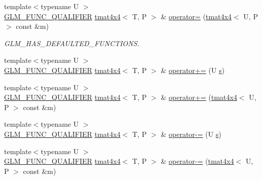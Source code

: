 \begin{DoxyCompactItemize}
\item 
{\footnotesize template$<$typename U $>$ }\\\mbox{\hyperlink{setup_8hpp_a33fdea6f91c5f834105f7415e2a64407}{G\+L\+M\+\_\+\+F\+U\+N\+C\+\_\+\+Q\+U\+A\+L\+I\+F\+I\+ER}} \mbox{\hyperlink{structglm_1_1tmat4x4}{tmat4x4}}$<$ T, P $>$ \& \mbox{\hyperlink{structglm_1_1tmat4x4_a967c1c1711875b670d5a325d86566209}{operator=}} (\mbox{\hyperlink{structglm_1_1tmat4x4}{tmat4x4}}$<$ U, P $>$ const \&m)
\begin{DoxyCompactList}\small\item\em G\+L\+M\+\_\+\+H\+A\+S\+\_\+\+D\+E\+F\+A\+U\+L\+T\+E\+D\+\_\+\+F\+U\+N\+C\+T\+I\+O\+NS. \end{DoxyCompactList}\item 
{\footnotesize template$<$typename U $>$ }\\\mbox{\hyperlink{setup_8hpp_a33fdea6f91c5f834105f7415e2a64407}{G\+L\+M\+\_\+\+F\+U\+N\+C\+\_\+\+Q\+U\+A\+L\+I\+F\+I\+ER}} \mbox{\hyperlink{structglm_1_1tmat4x4}{tmat4x4}}$<$ T, P $>$ \& \mbox{\hyperlink{structglm_1_1tmat4x4_aef40b6c6931ba950e9414bc82e5ee0ed}{operator+=}} (U \mbox{\hyperlink{glad_8h_af1b1d5edfea6a34daee7389b1b5810ad}{s}})
\item 
{\footnotesize template$<$typename U $>$ }\\\mbox{\hyperlink{setup_8hpp_a33fdea6f91c5f834105f7415e2a64407}{G\+L\+M\+\_\+\+F\+U\+N\+C\+\_\+\+Q\+U\+A\+L\+I\+F\+I\+ER}} \mbox{\hyperlink{structglm_1_1tmat4x4}{tmat4x4}}$<$ T, P $>$ \& \mbox{\hyperlink{structglm_1_1tmat4x4_a6d28df7c71f90ad3c2d021e9e11eff4a}{operator+=}} (\mbox{\hyperlink{structglm_1_1tmat4x4}{tmat4x4}}$<$ U, P $>$ const \&m)
\item 
{\footnotesize template$<$typename U $>$ }\\\mbox{\hyperlink{setup_8hpp_a33fdea6f91c5f834105f7415e2a64407}{G\+L\+M\+\_\+\+F\+U\+N\+C\+\_\+\+Q\+U\+A\+L\+I\+F\+I\+ER}} \mbox{\hyperlink{structglm_1_1tmat4x4}{tmat4x4}}$<$ T, P $>$ \& \mbox{\hyperlink{structglm_1_1tmat4x4_a70738b22e55ed76f5283241440f5e5ab}{operator-\/=}} (U \mbox{\hyperlink{glad_8h_af1b1d5edfea6a34daee7389b1b5810ad}{s}})
\item 
{\footnotesize template$<$typename U $>$ }\\\mbox{\hyperlink{setup_8hpp_a33fdea6f91c5f834105f7415e2a64407}{G\+L\+M\+\_\+\+F\+U\+N\+C\+\_\+\+Q\+U\+A\+L\+I\+F\+I\+ER}} \mbox{\hyperlink{structglm_1_1tmat4x4}{tmat4x4}}$<$ T, P $>$ \& \mbox{\hyperlink{structglm_1_1tmat4x4_a3162224a5aa306caa17ce2de9b2050cc}{operator-\/=}} (\mbox{\hyperlink{structglm_1_1tmat4x4}{tmat4x4}}$<$ U, P $>$ const \&m)

\end{DoxyCompactItemize}
